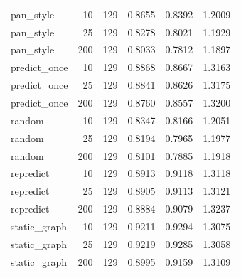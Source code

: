 \begin{table}[t]
\begin{tabular}{lrrrrr}
pan\_style & 10 & 129 & 0.8655 & 0.8392 & 1.2009 \\
pan\_style & 25 & 129 & 0.8278 & 0.8021 & 1.1929 \\
pan\_style & 200 & 129 & 0.8033 & 0.7812 & 1.1897 \\
predict\_once & 10 & 129 & 0.8868 & 0.8667 & 1.3163 \\
predict\_once & 25 & 129 & 0.8841 & 0.8626 & 1.3175 \\
predict\_once & 200 & 129 & 0.8760 & 0.8557 & 1.3200 \\
random & 10 & 129 & 0.8347 & 0.8166 & 1.2051 \\
random & 25 & 129 & 0.8194 & 0.7965 & 1.1977 \\
random & 200 & 129 & 0.8101 & 0.7885 & 1.1918 \\
repredict & 10 & 129 & 0.8913 & 0.9118 & 1.3118 \\
repredict & 25 & 129 & 0.8905 & 0.9113 & 1.3121 \\
repredict & 200 & 129 & 0.8884 & 0.9079 & 1.3237 \\
static\_graph & 10 & 129 & 0.9211 & 0.9294 & 1.3075 \\
static\_graph & 25 & 129 & 0.9219 & 0.9285 & 1.3058 \\
static\_graph & 200 & 129 & 0.8995 & 0.9159 & 1.3109 \\
\bottomrule
\end{tabular}
\end{table}
